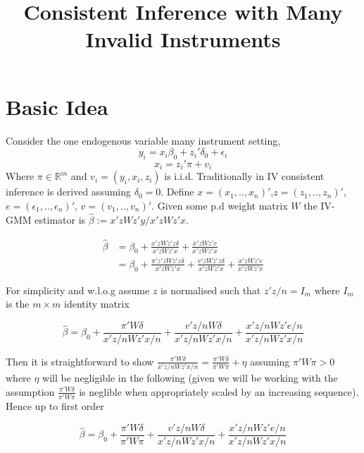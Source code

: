 \documentclass[11pt, fleqn]{article}
\begin{document}
\title{\textbf{Consistent Inference with Many Invalid Instruments}}




\maketitle

\section{Basic Idea}
Consider the one endogenous variable many instrument setting,
\begin{equation} y_i=x_i\beta_0+z_i'\delta_0+\epsilon_i \end{equation}
\begin{equation} x_i=z_i'\pi+v_i \end{equation}
Where $\pi \in \mathbb{R}^m$ and $v_i=(y_i,x_i,z_i)$ is i.i.d. Traditionally in IV consistent inference is derived assuming $\delta_0=0$. Define $x=(x_1,..,x_n)'$,$z=(z_1,..,z_n)'$, $e=(\epsilon_1,..,\epsilon_n)'$, $v=(v_1,..,v_n)'$. Given some p.d weight matrix $W$ the IV-GMM estimator is $\hat{\beta}:=x'zWz'y/x'zWz'x$.

\begin{align}\hat{\beta}&=\beta_0+  \frac{x'zWz'z\delta}{x'zWz'x}+  \frac{x'zWz'e}{x'zWz'x}\\
&= \beta_0+  \frac{\pi'z'zWz'z\delta}{x'zWz'x}+  \frac{v'zWz'z\delta}{x'zWz'x} +\frac{x'zWz'e}{x'zWz'x}
\end{align}

For simplicity and w.l.o.g assume $z$ is normalised such that $z'z/n=I_m$ where $I_m$ is the $m\times m$ identity matrix


\begin{equation}\hat{\beta}=\beta_0+   \frac{\pi'W\delta}{x'z/nWz'x/n}+  \frac{v'z/nW\delta}{x'z/nWz'x/n}+ \frac{x'z/nWz'e/n}{x'z/nWz'x/n}\end{equation}

Then it is straightforward to show $ \frac{\pi'W\delta}{x'z/nWz'x/n}= \frac{\pi'W\delta}{\pi'W\pi}+\eta$  assuming $\pi'W\pi>0$ where $\eta$ will be negligible in the following (given we will be working with  the assumption $\frac{\pi'W\delta}{\pi'W\pi}$ is neglible when appropriately scaled by an increasing sequence). Hence up to first order

\begin{equation} \label{cons}\hat{\beta}=\beta_0+   \frac{\pi'W\delta}{\pi'W\pi}+  \frac{v'z/nW\delta}{x'z/nWz'x/n} + \frac{x'z/nWz'e/n}{x'z/nWz'x/n}\end{equation}
\end{document}
